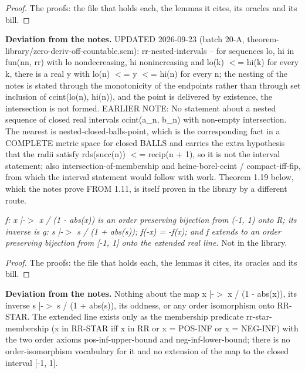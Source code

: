 %
\begin{proof}
%
The proofs: the file that holds each, the lemmas it cites, its oracles and its bill.
%
%
%
%
\end{proof}
%
\noindent\textbf{Deviation from the notes.} UPDATED 2026-09-23 (batch 20-A, theorem-library/zero-deriv-off-countable.scm): rr-nested-intervals -- for sequences lo, hi in fun(nn, rr) with lo nondecreasing, hi nonincreasing and lo(k) $<$= hi(k) for every k, there is a real y with lo(n) $<$= y $<$= hi(n) for every n; the nesting of the notes is stated through the monotonicity of the endpoints rather than through set inclusion of ccint(lo(n), hi(n)), and the point is delivered by existence, the intersection is not formed. EARLIER NOTE: No statement about a nested sequence of closed real intervals ccint(a\_n, b\_n) with non-empty intersection. The nearest is nested-closed-balls-point, which is the corresponding fact in a COMPLETE metric space for closed BALLS and carries the extra hypothesis that the radii satisfy rds(succ(n)) $<$= recip(n + 1), so it is not the interval statement; also intersection-of-membership and heine-borel-ccint / compact-iff-fip, from which the interval statement would follow with work. Theorem 1.19 below, which the notes prove FROM 1.11, is itself proven in the library by a different route.
%
\renewcommand{\thethm}{1.13}
\begin{prop}\label{thm:calculus-1.13}
%
\textit{f: x |-$>$ x / (1 - abs(x)) is an order preserving bijection from (-1, 1) onto R; its inverse is g: s |-$>$ s / (1 + abs(s)); f(-x) = -f(x); and f extends to an order preserving bijection from [-1, 1] onto the extended real line.}
%
Not in the library.
%
\end{prop}
%
\begin{proof}
%
The proofs: the file that holds each, the lemmas it cites, its oracles and its bill.
%
%
\end{proof}
%
\noindent\textbf{Deviation from the notes.} Nothing about the map x |-$>$ x / (1 - abs(x)), its inverse s |-$>$ s / (1 + abs(s)), its oddness, or any order isomorphism onto RR-STAR. The extended line exists only as the membership predicate rr-star-membership (x in RR-STAR iff x in RR or x = POS-INF or x = NEG-INF) with the two order axioms pos-inf-upper-bound and neg-inf-lower-bound; there is no order-isomorphism vocabulary for it and no extension of the map to the closed interval [-1, 1].
